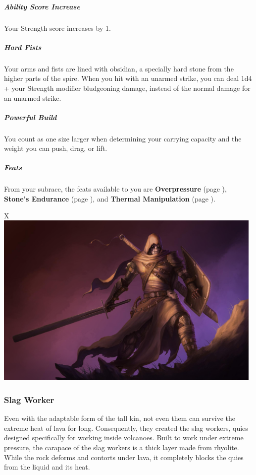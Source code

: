     \subparagraph{Ability Score Increase} Your Strength score increases by 1.

    \subparagraph{Hard Fists} Your arms and fists are lined with obsidian, a specially hard stone from the higher parts of the spire.
    When you hit with an unarmed strike, you can deal 1d4 + your Strength modifier bludgeoning damage, instead of the normal damage for an unarmed strike.

    \subparagraph{Powerful Build} You count as one size larger when determining your carrying capacity and the weight you can push, drag, or lift.

    \subparagraph{Feats} From your subrace, the feats available to you are
    \textbf{Overpressure} (page \pageref{feat::overpressure}),
    \textbf{Stone's Endurance} (page \pageref{feat::stonesendurance}), and
    \textbf{Thermal Manipulation} (page \pageref{feat::thermalmanipulation}).

\begin{table}[b]%
    \begin{DndTable}[width=\linewidth]{X}
        \includegraphics[width=0.98\textwidth]{04kins/img/21quies_executioner.jpg}
    \end{DndTable}
\end{table}

\subsubsection{Slag Worker}
    Even with the adaptable form of the tall kin, not even them can survive the extreme heat of lava for long.
    Consequently, they created the slag workers, quies designed specifically for working inside volcanoes.
    Built to work under extreme pressure, the carapace of the slag workers is a thick layer made from rhyolite.
    While the rock deforms and contorts under lava, it completely blocks the quies from the liquid and its heat.

